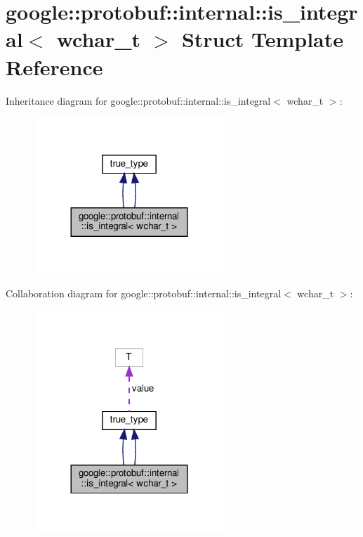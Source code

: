 \hypertarget{structgoogle_1_1protobuf_1_1internal_1_1is__integral_3_01wchar__t_01_4}{}\section{google\+:\+:protobuf\+:\+:internal\+:\+:is\+\_\+integral$<$ wchar\+\_\+t $>$ Struct Template Reference}
\label{structgoogle_1_1protobuf_1_1internal_1_1is__integral_3_01wchar__t_01_4}


Inheritance diagram for google\+:\+:protobuf\+:\+:internal\+:\+:is\+\_\+integral$<$ wchar\+\_\+t $>$\+:
\nopagebreak
\begin{figure}[H]
\begin{center}
\leavevmode
\includegraphics[width=204pt]{structgoogle_1_1protobuf_1_1internal_1_1is__integral_3_01wchar__t_01_4__inherit__graph}
\end{center}
\end{figure}


Collaboration diagram for google\+:\+:protobuf\+:\+:internal\+:\+:is\+\_\+integral$<$ wchar\+\_\+t $>$\+:
\nopagebreak
\begin{figure}[H]
\begin{center}
\leavevmode
\includegraphics[width=204pt]{structgoogle_1_1protobuf_1_1internal_1_1is__integral_3_01wchar__t_01_4__coll__graph}
\end{center}
\end{figure}
